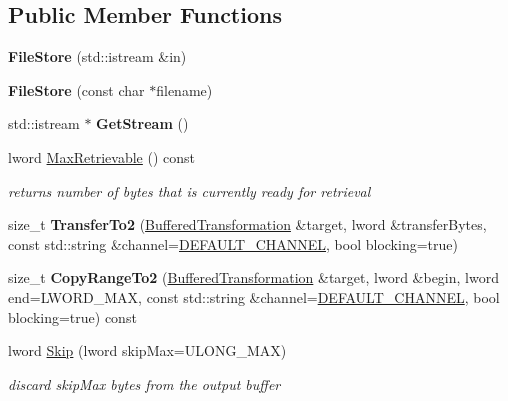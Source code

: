 \subsection*{Public Member Functions}
\begin{DoxyCompactItemize}
\item 
\hypertarget{class_file_store_a4a3ea09952e93c4db7fedf277c6d217e}{
{\bfseries FileStore} (std::istream \&in)}
\label{class_file_store_a4a3ea09952e93c4db7fedf277c6d217e}

\item 
\hypertarget{class_file_store_a27d2d16927f16301fb178b676794a1fc}{
{\bfseries FileStore} (const char $\ast$filename)}
\label{class_file_store_a27d2d16927f16301fb178b676794a1fc}

\item 
\hypertarget{class_file_store_a52271ff9a07861683eb41b9df0be7081}{
std::istream $\ast$ {\bfseries GetStream} ()}
\label{class_file_store_a52271ff9a07861683eb41b9df0be7081}

\item 
lword \hyperlink{class_file_store_ac003753c1e1a312cdaa6149e5f53bfb9}{MaxRetrievable} () const 
\begin{DoxyCompactList}\small\item\em returns number of bytes that is currently ready for retrieval \item\end{DoxyCompactList}\item 
\hypertarget{class_file_store_a0c42d1ff63da94c678f44df13d79468b}{
size\_\-t {\bfseries TransferTo2} (\hyperlink{class_buffered_transformation}{BufferedTransformation} \&target, lword \&transferBytes, const std::string \&channel=\hyperlink{cryptlib_8h_a6f1917f54ea8c2a45de6e08c5087c8de}{DEFAULT\_\-CHANNEL}, bool blocking=true)}
\label{class_file_store_a0c42d1ff63da94c678f44df13d79468b}

\item 
\hypertarget{class_file_store_a3391cde43a9f8aa0f8e7b6cf2a1bac45}{
size\_\-t {\bfseries CopyRangeTo2} (\hyperlink{class_buffered_transformation}{BufferedTransformation} \&target, lword \&begin, lword end=LWORD\_\-MAX, const std::string \&channel=\hyperlink{cryptlib_8h_a6f1917f54ea8c2a45de6e08c5087c8de}{DEFAULT\_\-CHANNEL}, bool blocking=true) const }
\label{class_file_store_a3391cde43a9f8aa0f8e7b6cf2a1bac45}

\item 
\hypertarget{class_file_store_a224d31ea858a3c890fec604a030db7cf}{
lword \hyperlink{class_file_store_a224d31ea858a3c890fec604a030db7cf}{Skip} (lword skipMax=ULONG\_\-MAX)}
\label{class_file_store_a224d31ea858a3c890fec604a030db7cf}

\begin{DoxyCompactList}\small\item\em discard skipMax bytes from the output buffer \item\end{DoxyCompactList}\end{DoxyCompactItemize}


